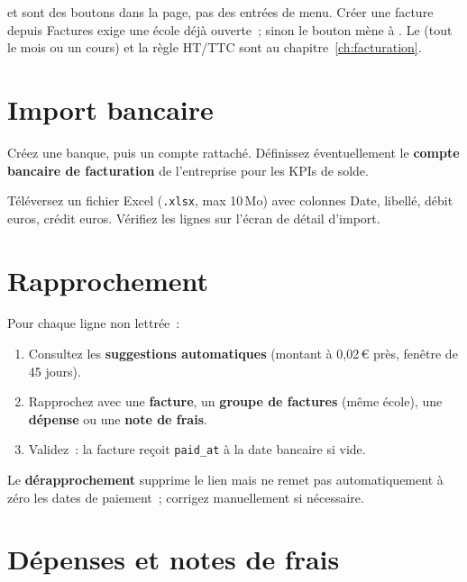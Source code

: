  et  sont des boutons dans la page, pas des entrées de menu. Créer une facture depuis Factures exige une école déjà ouverte~; sinon le bouton mène à . Le  (tout le mois ou un cours) et la règle HT/TTC sont au chapitre~\ref{ch:facturation}.

\section{Import bancaire}

\begin{workflowstep}
  Créez une banque, puis un compte rattaché. Définissez éventuellement le \textbf{compte bancaire de facturation} de l'entreprise pour les KPIs de solde.
\end{workflowstep}

\begin{workflowstep}
  Téléversez un fichier Excel (\texttt{.xlsx}, max 10\,Mo) avec colonnes Date, libellé, débit euros, crédit euros. Vérifiez les lignes sur l'écran de détail d'import.
\end{workflowstep}

\section{Rapprochement}

Pour chaque ligne non lettrée~:

\begin{enumerate}[label=\textbf{\arabic*.}]
  \item Consultez les \textbf{suggestions automatiques} (montant à 0{,}02\,€ près, fenêtre de 45 jours).
  \item Rapprochez avec une \textbf{facture}, un \textbf{groupe de factures} (même école), une \textbf{dépense} ou une \textbf{note de frais}.
  \item Validez~: la facture reçoit \texttt{paid\_at} à la date bancaire si vide.
\end{enumerate}

\begin{avertissement}
  Le \textbf{dérapprochement} supprime le lien mais ne remet pas automatiquement à zéro les dates de paiement~; corrigez manuellement si nécessaire.
\end{avertissement}

\section{Dépenses et notes de frais}

